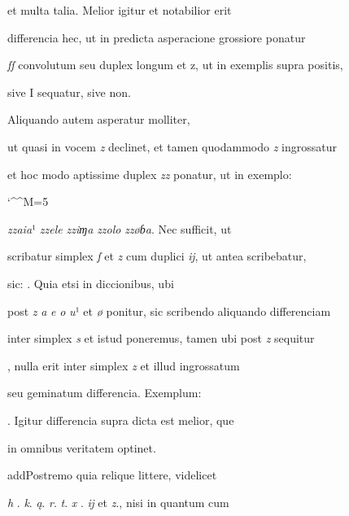 et multa talia. Melior igitur et notabilior erit 

differencia hec, ut in predicta asperacione grossiore ponatur 

\textit{ſſ} convolutum seu duplex longum et z, ut in exemplis supra positis, 

\splitlines

sive I sequatur, sive non.

\indentK Aliquando autem asperatur molliter, 

\fulllines

ut quasi in vocem \textit{z} declinet, et tamen quodammodo \textit{z} ingrossatur 

et hoc modo aptissime duplex \textit{zz} ponatur, ut in exemplo: 

\catcode `\^^M=5
\obeylines

\textit{zzaia}¹ \textit{zzele} \textit{zziɱa} \textit{zzolo} \textit{zzøɓa}. Nec sufficit, ut 


scribatur simplex \textit{ſ} et \textit{z} cum duplici \textit{ĳ}, ut antea scribebatur, 

sic:  . Quia etsi in diccionibus, ubi 

post \textit{z} \textit{a} \textit{e} \textit{o} \textit{u}¹ et \textit{ø} ponitur, sic scribendo aliquando differenciam 

inter simplex \textit{s} et istud poneremus, tamen ubi post \textit{z} sequitur 

, nulla erit inter simplex \textit{z} et illud ingrossatum

seu geminatum differencia. Exemplum:   

. Igitur differencia 
supra dicta est melior, que 

in omnibus veritatem optinet. 

\indentP add{P}ostremo quia relique littere, videlicet 

\textit{h} . \textit{k}. \textit{ą}. \textit{r}. \textit{t}. \textit{x} . \textit{ĳ} et \textit{z}., nisi in quantum cum 


